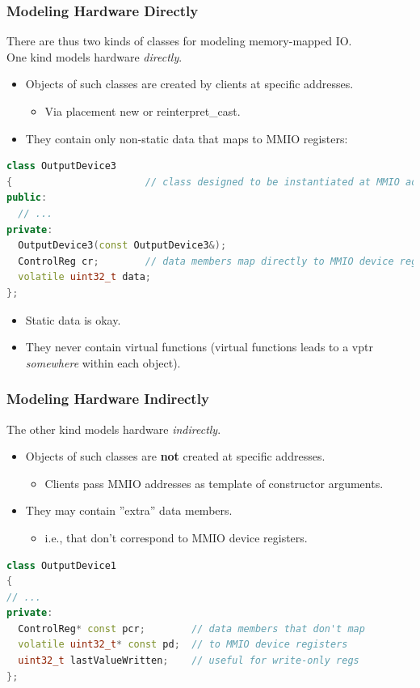 \subsubsection{Modeling Hardware Directly}
There are thus two kinds of classes for modeling memory-mapped IO.\\
One kind models hardware \textit{directly}.
\begin{itemize}
  \item Objects of such classes are created by clients at specific addresses.
  \begin{itemize}
    \item Via placement new or reinterpret\_cast.
  \end{itemize}
  \item They contain only non-static data that maps to MMIO registers:
\end{itemize}
\begin{lstlisting}[language=C++]
class OutputDevice3
{                       // class designed to be instantiated at MMIO addresses
public:
  // ...
private:
  OutputDevice3(const OutputDevice3&);
  ControlReg cr;        // data members map directly to MMIO device registers
  volatile uint32_t data;
};
\end{lstlisting}
\begin{itemize}
  \item Static data is okay.
  \item They never contain virtual functions (virtual functions leads to a vptr \textit{somewhere} within each object).
\end{itemize}

\subsubsection{Modeling Hardware Indirectly}
The other kind models hardware \textit{indirectly}.
\begin{itemize}
  \item Objects of such classes are \textbf{not} created at specific addresses.
  \begin{itemize}
    \item Clients pass MMIO addresses as template of constructor arguments.
  \end{itemize}
  \item They may contain ''extra'' data members.
  \begin{itemize}
    \item i.e., that don't correspond to MMIO device registers.
  \end{itemize}
\end{itemize}
\begin{lstlisting}[language=C++]
class OutputDevice1
{
// ...
private:
  ControlReg* const pcr;        // data members that don't map
  volatile uint32_t* const pd;  // to MMIO device registers
  uint32_t lastValueWritten;    // useful for write-only regs
};
\end{lstlisting}

